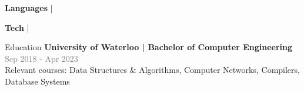 \documentclass[hidelinks]{resume} %
\begin{document}
\vspace{-.05cm}
\begin{rSubsection}{\textbf{Languages} | }{}{}

\end{rSubsection}
\vspace{-.20cm}
\begin{rSubsection}{\textbf{Tech} | }{}{}

\end{rSubsection}

\vspace{-.20cm}

\begin{rSection}{Education}
\vspace{-.1cm}
{\textbf{University of Waterloo | Bachelor of Computer Engineering}} \hfill {\textcolor{gray}{\small Sep 2018 - Apr 2023}} 
\\ {Relevant courses: Data Structures \& Algorithms, Computer Networks, Compilers, Database Systems}
\vspace{.1cm}
\end{rSection}
\end{document}
